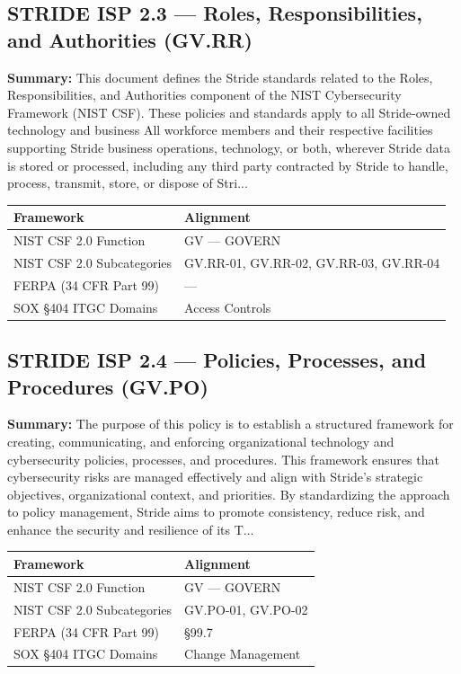 \documentclass[11pt,landscape]{article}
\begin{document}
\subsection{\textcolor{strideblue}{STRIDE ISP 2.3} --- Roles, Responsibilities, and Authorities (GV.RR)}
\label{pol:ISP23}

\textbf{Summary:} This document defines the Stride standards related to the Roles, Responsibilities, and Authorities component of the NIST Cybersecurity Framework (NIST CSF). These policies and standards apply to all Stride-owned technology and business All workforce members and their respective facilities supporting Stride business operations, technology, or both, wherever Stride data is stored or processed, including any third party contracted by Stride to handle, process, transmit, store, or dispose of Stri...

\begin{tabularx}{\textwidth}{|p{4cm}|X|}
\hline
\rowcolor{headgray} \textbf{Framework} & \textbf{Alignment} \\
\hline
NIST CSF 2.0 Function & GV --- GOVERN \\
\hline
NIST CSF 2.0 Subcategories & GV.RR-01, GV.RR-02, GV.RR-03, GV.RR-04 \\
\hline
FERPA (34 CFR Part 99) & --- \\
\hline
SOX §404 ITGC Domains & Access Controls \\
\hline
\end{tabularx}


\subsection{\textcolor{strideblue}{STRIDE ISP 2.4} --- Policies, Processes, and Procedures (GV.PO)}
\label{pol:ISP24}

\textbf{Summary:} The purpose of this policy is to establish a structured framework for creating, communicating, and enforcing organizational technology and cybersecurity policies, processes, and procedures. This framework ensures that cybersecurity risks are managed effectively and align with Stride’s strategic objectives, organizational context, and priorities. By standardizing the approach to policy management, Stride aims to promote consistency, reduce risk, and enhance the security and resilience of its T...

\begin{tabularx}{\textwidth}{|p{4cm}|X|}
\hline
\rowcolor{headgray} \textbf{Framework} & \textbf{Alignment} \\
\hline
NIST CSF 2.0 Function & GV --- GOVERN \\
\hline
NIST CSF 2.0 Subcategories & GV.PO-01, GV.PO-02 \\
\hline
FERPA (34 CFR Part 99) & §99.7 \\
\hline
SOX §404 ITGC Domains & Change Management \\
\hline
\end{tabularx}
\end{document}

